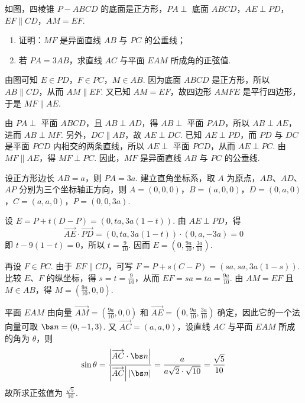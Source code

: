 \begin{problem}
如图，四棱锥 \(P - ABCD\) 的底面是正方形，\(PA \perp\) 底面 \(ABCD\)，\(AE \perp PD\)，\(EF \parallel CD\)，\(AM = EF\).

\begin{enumerate}
\item 证明：\(MF\) 是异面直线 \(AB\) 与 \(PC\) 的公垂线；
\item 若 \(PA = 3AB\)，求直线 \(AC\) 与平面 \(EAM\) 所成角的正弦值.
\end{enumerate}

\end{problem}

\begin{solution}
由图可知 \(E\in PD\)，\(F\in PC\)，\(M\in AB\). 因为底面 \(ABCD\) 是正方形，所以 \(AB\parallel CD\)，从而 \(AM\parallel EF\). 又已知 \(AM=EF\)，故四边形 \(AMFE\) 是平行四边形，于是 \(MF\parallel AE\).

由 \(PA\perp\) 平面 \(ABCD\)，且 \(AB\perp AD\)，得 \(AB\perp\) 平面 \(PAD\)，所以 \(AB\perp AE\)，进而 \(AB\perp MF\). 另外，\(DC\parallel AB\)，故 \(AE\perp DC\). 已知 \(AE\perp PD\)，而 \(PD\) 与 \(DC\) 是平面 \(PCD\) 内相交的两条直线，所以 \(AE\perp\) 平面 \(PCD\)，从而 \(AE\perp PC\). 由 \(MF\parallel AE\)，得 \(MF\perp PC\). 因此，\(MF\) 是异面直线 \(AB\) 与 \(PC\) 的公垂线.

设正方形边长 \(AB=a\)，则 \(PA=3a\). 建立直角坐标系，取 \(A\) 为原点，\(AB\)、\(AD\)、\(AP\) 分别为三个坐标轴正方向，则
\(A=(0,0,0)\)，\(B=(a,0,0)\)，\(D=(0,a,0)\)，\(C=(a,a,0)\)，\(P=(0,0,3a)\).

设 \(E=P+t(D-P)=(0,ta,3a(1-t))\). 由 \(AE\perp PD\)，得
\[
\overrightarrow{AE}\cdot\overrightarrow{PD}=(0,ta,3a(1-t))\cdot(0,a,-3a)=0
\]
即 \(t-9(1-t)=0\)，所以 \(t=\frac9{10}\). 因而 \(E=(0,\frac{9a}{10},\frac{3a}{10})\).

再设 \(F\in PC\). 由于 \(EF\parallel CD\)，可写 \(F=P+s(C-P)=(sa,sa,3a(1-s))\). 比较 \(E\)、\(F\) 的纵坐标，得 \(s=t=\frac9{10}\)，从而 \(EF=sa=ta=\frac{9a}{10}\). 由 \(AM=EF\) 且 \(M\in AB\)，得 \(M=(\frac{9a}{10},0,0)\).

平面 \(EAM\) 由向量 \(\overrightarrow{AM}=(\frac{9a}{10},0,0)\) 和 \(\overrightarrow{AE}=(0,\frac{9a}{10},\frac{3a}{10})\) 确定，因此它的一个法向量可取 \(\bs n=(0,-1,3)\). 又 \(\overrightarrow{AC}=(a,a,0)\)，设直线 \(AC\) 与平面 \(EAM\) 所成的角为 \(\theta\)，则
\[
\sin\theta=\frac{\left|\overrightarrow{AC}\cdot\bs n\right|}{\left|\overrightarrow{AC}\right|\left|\bs n\right|}=\frac{a}{a\sqrt{2}\cdot\sqrt{10}}=\frac{\sqrt{5}}{10}
\]
故所求正弦值为 \(\frac{\sqrt{5}}{10}\).
\end{solution}

